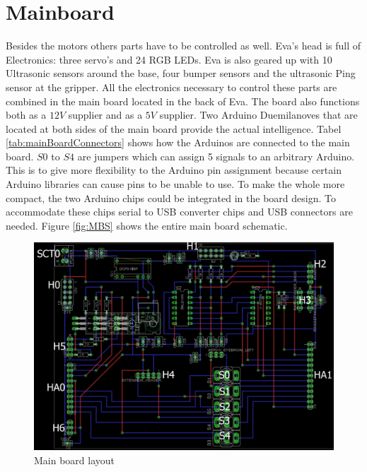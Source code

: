 \documentclass[technical_document.tex]{subfiles}
\begin{document}
\newpage
\section{Mainboard}

Besides the motors others parts have to be controlled as well. Eva's head is full of Electronics: three servo's and 24 RGB LEDs. Eva is also geared up with 10 Ultrasonic sensors around the base, four bumper sensors and the ultrasonic Ping sensor at the gripper.  All the electronics necessary to control these parts are combined in the main board located in the back of Eva. The board also functions both as a $12V$ supplier and as a $5V$ supplier.
Two Arduino Duemilanoves that are located at both sides of the main board provide the actual intelligence. Tabel \ref{tab:mainBoardConnectors} shows how the Arduinos are connected to the main board. $S0$ to $S4$ are jumpers which can assign 5 signals to an arbitrary Arduino. This is to give more flexibility to the Arduino pin assignment because certain Arduino libraries can cause pins to be unable to use. To make the whole more compact, the two Arduino chips could be integrated in the board design. To accommodate these chips serial to USB converter chips and USB connectors are needed. Figure \ref{fig:MBS} shows the entire main board schematic.


 \begin{figure}[ht!]
	\centering
	\mbox{\includegraphics[scale=1.0]{Images/MainBoard_Specs.png}}
	\caption{Main board layout}
	\label{fig:main_board_layout}
\end{figure}
\end{document}
